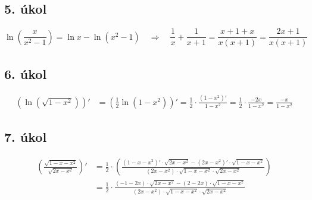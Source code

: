\documentclass[a4paper,11pt,twocolumn]{article}
\begin{document}
\subsection*{5. úkol}
\[
\ln\left(\frac{x}{x^2-1}\right) =  \ln x - \ln(x^2 - 1)
\quad \Rightarrow \quad
\frac{1}{x} + \frac{1}{x + 1} = \frac{x + 1 + x}{x(x + 1)} = \frac{2x + 1}{x(x + 1)}
\]

\subsection*{6. úkol}
\begin{align*}
\left( \ln\left( \sqrt{1 - x^2} \right) \right)' &= \left( \frac{1}{2} \ln(1 - x^2) \right)' = \frac{1}{2} \cdot \frac{(1 - x^2)'}{1 - x^2} = \frac{1}{2} \cdot \frac{-2x}{1 - x^2} = \frac{-x}{1 - x^2}
\end{align*}

\subsection*{7. úkol}
\begin{align*}
\left( \frac{\sqrt{1 - x - x^2}}{\sqrt{2x - x^2}} \right)' 
&= \frac{1}{2} \cdot \left( \frac{(1 - x - x^2)' \cdot \sqrt{2x - x^2} - (2x - x^2)' \cdot \sqrt{1 - x - x^2}}{(2x - x^2) \cdot \sqrt{1 - x - x^2} \cdot \sqrt{2x - x^2}} \right) \\
&= \frac{1}{2} \cdot \frac{(-1 - 2x) \cdot \sqrt{2x - x^2} - (2 - 2x) \cdot \sqrt{1 - x - x^2}}{(2x - x^2) \cdot \sqrt{1 - x - x^2} \cdot \sqrt{2x - x^2}}
\end{align*}
\end{document}
